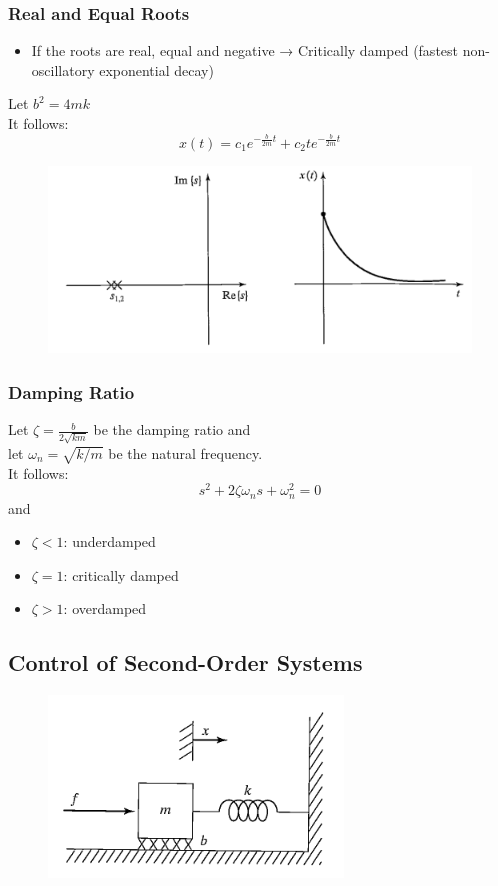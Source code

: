 \documentclass[10pt,a4paper]{article}
\begin{document}
\subsubsection{Real and Equal Roots}
\begin{itemize}
	\item If the roots are real, equal and negative → Critically damped (fastest non-oscillatory exponential decay)
\end{itemize}

Let $b^2 = 4 mk$ \\
It follows:
$$
	x(t) = c_1 e^{-\frac{b}{2m}t} + c_2 t e^{-\frac{b}{2m}t}
$$

\begin{figure}[H]
	\includegraphics[width=0.5\columnwidth]{imgs/dgl_re_eq.png}
\end{figure}

\subsubsection{Damping Ratio}
Let $\zeta = \frac{b}{2\sqrt{km}}$ be the damping ratio and \\
let $\omega_n = \sqrt{k/m}$ be the natural frequency. \\
It follows:
$$
s^2 + 2\zeta \omega_n s + \omega_n^2 = 0
$$
and
\begin{itemize}
	\item $\zeta < 1$: underdamped
	\item $\zeta = 1$: critically damped
	\item $\zeta > 1$: overdamped
\end{itemize}

\subsection{Control of Second-Order Systems}
\begin{figure}[H]
	\includegraphics[width=0.5\columnwidth]{imgs/spring_mass_act.png}
\end{figure}
\end{document}
